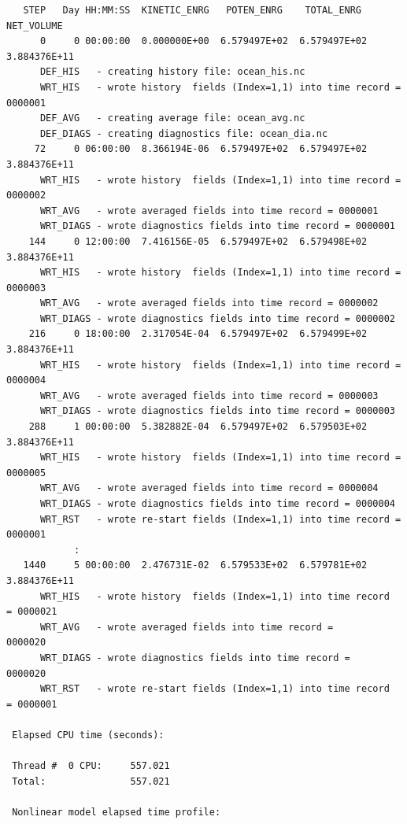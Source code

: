\begin{verbatim}
   STEP   Day HH:MM:SS  KINETIC_ENRG   POTEN_ENRG    TOTAL_ENRG   NET_VOLUME
      0     0 00:00:00  0.000000E+00  6.579497E+02  6.579497E+02 3.884376E+11
      DEF_HIS   - creating history file: ocean_his.nc
      WRT_HIS   - wrote history  fields (Index=1,1) into time record = 0000001
      DEF_AVG   - creating average file: ocean_avg.nc
      DEF_DIAGS - creating diagnostics file: ocean_dia.nc
     72     0 06:00:00  8.366194E-06  6.579497E+02  6.579497E+02 3.884376E+11
      WRT_HIS   - wrote history  fields (Index=1,1) into time record = 0000002
      WRT_AVG   - wrote averaged fields into time record = 0000001
      WRT_DIAGS - wrote diagnostics fields into time record = 0000001
    144     0 12:00:00  7.416156E-05  6.579497E+02  6.579498E+02 3.884376E+11
      WRT_HIS   - wrote history  fields (Index=1,1) into time record = 0000003
      WRT_AVG   - wrote averaged fields into time record = 0000002
      WRT_DIAGS - wrote diagnostics fields into time record = 0000002
    216     0 18:00:00  2.317054E-04  6.579497E+02  6.579499E+02 3.884376E+11
      WRT_HIS   - wrote history  fields (Index=1,1) into time record = 0000004
      WRT_AVG   - wrote averaged fields into time record = 0000003
      WRT_DIAGS - wrote diagnostics fields into time record = 0000003
    288     1 00:00:00  5.382882E-04  6.579497E+02  6.579503E+02 3.884376E+11
      WRT_HIS   - wrote history  fields (Index=1,1) into time record = 0000005
      WRT_AVG   - wrote averaged fields into time record = 0000004
      WRT_DIAGS - wrote diagnostics fields into time record = 0000004
      WRT_RST   - wrote re-start fields (Index=1,1) into time record = 0000001
            :
   1440     5 00:00:00  2.476731E-02  6.579533E+02  6.579781E+02
3.884376E+11
      WRT_HIS   - wrote history  fields (Index=1,1) into time record
= 0000021
      WRT_AVG   - wrote averaged fields into time record =
0000020
      WRT_DIAGS - wrote diagnostics fields into time record =
0000020
      WRT_RST   - wrote re-start fields (Index=1,1) into time record
= 0000001

 Elapsed CPU time (seconds):

 Thread #  0 CPU:     557.021
 Total:               557.021

 Nonlinear model elapsed time profile:


\end{verbatim}
